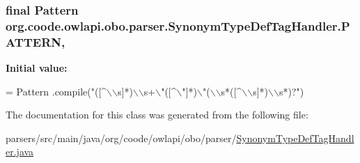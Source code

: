 \hypertarget{classorg_1_1coode_1_1owlapi_1_1obo_1_1parser_1_1_synonym_type_def_tag_handler_abd31ce993c9159269f61307e05ecf765}{
\subsubsection[{P\-A\-T\-T\-E\-R\-N}]{\setlength{\rightskip}{0pt plus 5cm}final Pattern org.\-coode.\-owlapi.\-obo.\-parser.\-Synonym\-Type\-Def\-Tag\-Handler.\-P\-A\-T\-T\-E\-R\-N\hspace{0.3cm}{\ttfamily [static]}, {\ttfamily [private]}}}\label{classorg_1_1coode_1_1owlapi_1_1obo_1_1parser_1_1_synonym_type_def_tag_handler_abd31ce993c9159269f61307e05ecf765}
{\bfseries Initial value\-:}
\begin{DoxyCode}
= Pattern
            .compile(\textcolor{stringliteral}{"([^\(\backslash\)\(\backslash\)s]*)\(\backslash\)\(\backslash\)s+\(\backslash\)"([^\(\backslash\)"]*)\(\backslash\)"(\(\backslash\)\(\backslash\)s*([^\(\backslash\)\(\backslash\)s]*)\(\backslash\)\(\backslash\)s*)?"})
\end{DoxyCode}


The documentation for this class was generated from the following file\-:\begin{DoxyCompactItemize}
\item 
parsers/src/main/java/org/coode/owlapi/obo/parser/\hyperlink{_synonym_type_def_tag_handler_8java}{Synonym\-Type\-Def\-Tag\-Handler.\-java}\end{DoxyCompactItemize}
